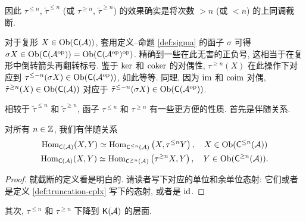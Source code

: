 因此 $\tau^{\leq n}$, $\tilde{\tau}^{\leq n}$ (或 $\tau^{\geq n}$, $\tilde{\tau}^{\geq n}$) 的效果确实是将次数 $> n$ (或 $< n$) 的上同调截断.

\begin{remark}\label{rem:truncation-sigma}
	对于复形 $X \in \operatorname{Ob}(\mathsf{C}(\mathcal{A}))$, 套用定义--命题 \ref{def:sigma} 的函子 $\sigma$ 可得 $\sigma X \in \operatorname{Ob}(\mathsf{C}(\mathcal{A}^{\operatorname{op}})) = \operatorname{Ob}(\mathsf{C}(\mathcal{A}^{\operatorname{op}})^{\operatorname{op}})$. 精确到一些在此无害的正负号, 这相当于在复形中倒转箭头再翻转标号. 鉴于 $\operatorname{ker}$ 和 $\operatorname{coker}$ 的对偶性, $\tau^{\geq n}(X)$ 在此操作下对应到 $\tau^{\leq -n}(\sigma X) \in \operatorname{Ob}(\mathsf{C}(\mathcal{A}^{\operatorname{op}}))$, 如此等等. 同理, 因为 $\operatorname{im}$ 和 $\operatorname{coim}$ 对偶, $\tilde{\tau}^{\geq n}(X) \in \operatorname{Ob}(\mathsf{C}(\mathcal{A}))$ 对应于 $\tilde{\tau}^{\leq -n}(\sigma X) \in \operatorname{Ob}(\mathsf{C}(\mathcal{A}^{\operatorname{op}}))$.
\end{remark}

相较于 $\tilde{\tau}^{\leq n}$ 和 $\tilde{\tau}^{\geq n}$, 函子 $\tau^{\leq n}$ 和 $\tau^{\geq n}$ 有一些更方便的性质. 首先是伴随关系.

\begin{proposition}\label{prop:truncation-adjunction}
	对所有 $n \in \mathbb{Z}$, 我们有伴随关系
	\begin{gather*}
		\operatorname{Hom}_{\mathsf{C}(\mathcal{A})}(X, Y) \simeq \operatorname{Hom}_{\mathsf{C}^{\leq n}(\mathcal{A})}\left(X, \tau^{\leq n} Y \right), \quad X \in \operatorname{Ob}(\mathsf{C}^{\leq n}(\mathcal{A})) \\ \operatorname{Hom}_{\mathsf{C}(\mathcal{A})}(X, Y) \simeq \operatorname{Hom}_{\mathsf{C}^{\geq n}(\mathcal{A})}\left(\tau^{\geq n} X, Y \right), \quad Y \in \operatorname{Ob}(\mathsf{C}^{\geq n}(\mathcal{A})).
	\end{gather*}
\end{proposition}
\begin{proof}
	就截断的定义看是明白的. 请读者写下对应的单位和余单位态射: 它们或者是定义 \ref{def:truncation-cplx} 写下的态射, 或者是 $\mathrm{id}$.
\end{proof}

其次, $\tau^{\leq n}$ 和 $\tau^{\geq n}$ 下降到 $\mathsf{K}(\mathcal{A})$ 的层面.

